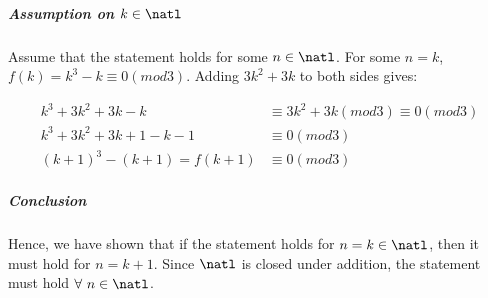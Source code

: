 \subparagraph{Assumption on $k \in \natl$}
Assume that the statement holds for some $n \in \natl$.
For some $n = k$, $f(k) = k^3 - k \equiv 0(mod 3)$.
Adding $3k^2 + 3k$ to both sides gives:

\begin{align*}
  k^3 + 3k^2 + 3k - k &\equiv 3k^2 + 3k (mod 3) \equiv 0 (mod 3) \\
  k^3 + 3k^2 + 3k + 1 - k - 1 &\equiv 0(mod 3) \\
  (k+1)^3 - (k+1) = f(k+1) &\equiv 0(mod 3)
\end{align*}

\subparagraph{Conclusion}
Hence, we have shown that if the statement holds for $n = k \in \natl$, then it must hold for $n = k+1$.
Since $\natl$ is closed under addition, the statement must hold $\forall\ n \in \natl$.
